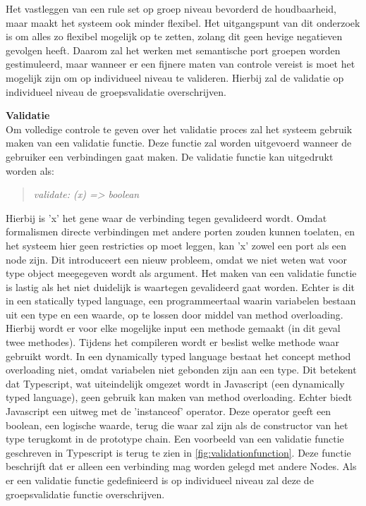 Het vastleggen van een rule set op groep niveau bevorderd de houdbaarheid, maar maakt het systeem ook minder flexibel. Het uitgangspunt van dit onderzoek is om alles zo flexibel mogelijk op te zetten, zolang dit geen hevige negatieven gevolgen heeft. Daarom zal het werken met semantische port groepen worden gestimuleerd, maar wanneer er een fijnere maten van controle vereist is moet het mogelijk zijn om op individueel niveau te valideren. Hierbij zal de validatie op individueel niveau de groepsvalidatie overschrijven.
\newline

\noindent\textbf{Validatie}\\
Om volledige controle te geven over het validatie proces zal het systeem gebruik maken van een validatie functie. Deze functie zal worden uitgevoerd wanneer de gebruiker een verbindingen gaat maken. De validatie functie kan uitgedrukt worden als:

\begin{quote} 
    \centering    
    \textit{
        validate: (x) =\textgreater{} boolean
    }
\end{quote}

Hierbij is 'x' het gene waar de verbinding tegen gevalideerd wordt. Omdat formalismen directe verbindingen met andere porten zouden kunnen toelaten, en het systeem hier geen restricties op moet leggen, kan 'x' zowel een port als een node zijn. Dit introduceert een nieuw probleem, omdat we niet weten wat voor type object meegegeven wordt als argument. Het maken van een validatie functie is lastig als het niet duidelijk is waartegen gevalideerd gaat worden. Echter is dit in een statically typed language, een programmeertaal waarin variabelen bestaan uit een type en een waarde, op te lossen door middel van method overloading. Hierbij wordt er voor elke mogelijke input een methode gemaakt (in dit geval twee methodes). Tijdens het compileren wordt er beslist welke methode waar gebruikt wordt. In een dynamically typed language bestaat het concept method overloading niet, omdat variabelen niet gebonden zijn aan een type. Dit betekent dat Typescript, wat uiteindelijk omgezet wordt in Javascript (een dynamically typed language), geen gebruik kan maken van method overloading. Echter biedt Javascript een uitweg met de 'instanceof' operator. Deze operator geeft een boolean, een logische waarde, terug die waar zal zijn als de constructor van het type terugkomt in de prototype chain. Een voorbeeld van een validatie functie geschreven in Typescript is terug te zien in 
\autoref{fig:validationfunction}. Deze functie beschrijft dat er alleen een verbinding mag worden gelegd met andere Nodes. Als er een validatie functie gedefinieerd is op individueel niveau zal deze de groepsvalidatie functie overschrijven.

